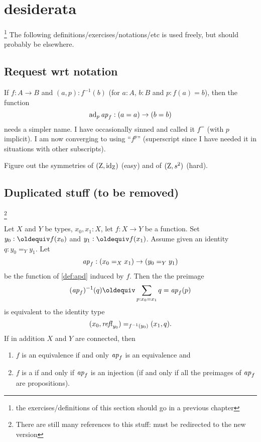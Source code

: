 {\color{blue}\small\section{desiderata}\footnote{the exercises/definitions of this section should go in a previous chapter}
The following definitions/exercises/notations/etc is used freely, but should probably be elsewhere.

\subsection{Request wrt notation}
\label{sec:requestnotation}

If $f:A\to B$ and $(a,p):f^{-1}(b)$ (for $a:A$, $b:B$ and $p:f(a)=b$), then the function
$$\mathrm{ad}_p\mathop{{\it ap}_{f}}:(a=a)\to(b=b)$$
needs a simpler name.  
I have occasionally sinned and called it $f^=$ (with $p$ implicit).  
I am now converging to using ``$f^p$'' (superscript since I have needed it in situations with other subscripts).

\begin{xca}\label{xca:zet-symmetries}
Figure out the symmetries of $(\mathrm{Z},\mathord{\mathrm{id}}_{\mathrm{Z}})$ (easy) and 
of $(\mathrm{Z},s^2)$ (hard).
\end{xca}

\subsection{Duplicated stuff (to be removed)}
\label{sec:eqconntypes}
\footnote{\color{red}There are still many references to this stuff: must be redirected to the new version}
\begin{lemma}
  \label{lem:eqandcovofconntypes}
  Let $X$ and $Y$ be types, $x_0,x_1:X$, let $f:X\to Y$ be a function.  Set $y_0\defequi f(x_0)$ and $y_1\defequi f(x_1)$. Assume given an identity $q:y_0=_Yy_1$. Let 
    $$%
\ap f:(x_0=_Xx_1)\to (y_0=_Yy_1)$$
be the function of \cref{def:apd} induced by $f$.  Then the  the preimage 
$$(\ap f)^{-1}(q)\oldequiv\sum_{p:x_0=x_1}q=\ap f(p)$$ is equivalent to the identity type 
 $$(x_0,\mathop{{\it refl}_{y_0}})=_{f^{-1}(y_0)}(x_1,q).$$ 
If in addition $X$ and $Y$ are connected, then
\begin{enumerate}
\item $f$ is an equivalence if and only $\ap f%
$ is an equivalence and
\item $f$ is a \covering if and only if  $\ap f%
$ is an injection (\ie if and only if all the preimages of $\mathop{{\it ap}_{f}}$ are propositions).
\end{enumerate}


\end{lemma}}
